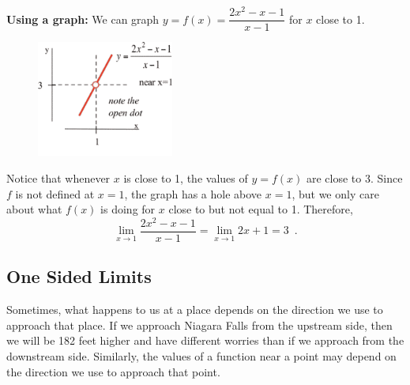 \begin{example}
\begin{solution}
{\bf Using a graph:} We can graph $y=f(x)=\dfrac{2x^2-x-1}{x-1}$ for $x$ close to 1.
\begin{figure}[!ht]
    \centering
    \includegraphics[width=0.4\textwidth]{img/chap2/image013.png}
    \label{$y=f(x)$ near $x=1$}
    \label{fig:2-4-limit-zoom}
\end{figure}
Notice that whenever $x$ is close to 1, the values of $y=f(x)$ are close to 3. Since $f$ is not defined at $x=1$, the graph has a hole above $x=1$, but we only care about what $f(x)$ is doing for $x$ close to but not equal to 1. Therefore,
$$\lim_{x\to 1}\dfrac{2x^2-x-1}{x-1}=\lim_{x\to 1}2x+1=3 \enspace.$$
\end{solution}\end{example}

\subsection{One Sided Limits}
Sometimes, what happens to us at a place depends on the direction we use to approach that place. If we approach Niagara Falls from the upstream side, then we will be 182 feet higher and have different worries than if we approach from the downstream side. Similarly, the values of a function near a point may depend on the direction we use to approach that point.

